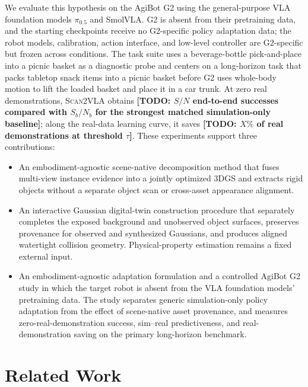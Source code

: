 \documentclass[letterpaper,10pt,conference]{ieeeconf}
\newcommand{\system}{\textsc{Scan2VLA}}
\newcommand{\todo}[1]{\textbf{[TODO: #1]}}
\newcommand{\piHalf}{\ensuremath{\pi_{0.5}}}
\begin{document}
We evaluate this hypothesis on the AgiBot G2 using the general-purpose VLA
foundation models \piHalf{} and SmolVLA. G2 is absent from their pretraining
data, and the starting checkpoints receive no G2-specific policy adaptation data;
the
robot models, calibration, action interface, and low-level controller are
G2-specific but frozen across conditions. The task suite uses a beverage-bottle
pick-and-place into a picnic basket as a diagnostic probe and centers on a
long-horizon task that packs tabletop snack
items into a picnic basket before G2 uses whole-body motion to lift the loaded
basket and place it in a car trunk. At zero real demonstrations, \system{} obtains
\todo{$S/N$ end-to-end successes compared with $S_b/N_b$ for the strongest
matched simulation-only baseline}; along the real-data learning curve, it saves
\todo{$X\%$ of real demonstrations at threshold $\tau$}. These experiments
support three contributions:
\begin{itemize}
  \item An embodiment-agnostic scene-native decomposition method that fuses
  multi-view instance evidence into a jointly optimized 3DGS and extracts rigid
  objects without a separate object scan or cross-asset appearance alignment.
  \item An interactive Gaussian digital-twin construction procedure that
  separately completes the exposed background and unobserved object surfaces,
  preserves provenance for observed and synthesized Gaussians, and produces
  aligned watertight collision geometry. Physical-property estimation remains a
  fixed external input.
  \item An embodiment-agnostic adaptation formulation and a controlled AgiBot G2
  study in which the target robot is absent from the VLA foundation models'
  pretraining data. The study separates generic simulation-only policy
  adaptation from the effect of scene-native asset provenance, and measures
  zero-real-demonstration success, sim--real predictiveness, and
  real-demonstration saving on the primary long-horizon benchmark.
\end{itemize}

\section{Related Work}
\label{sec:related-work}
\end{document}
